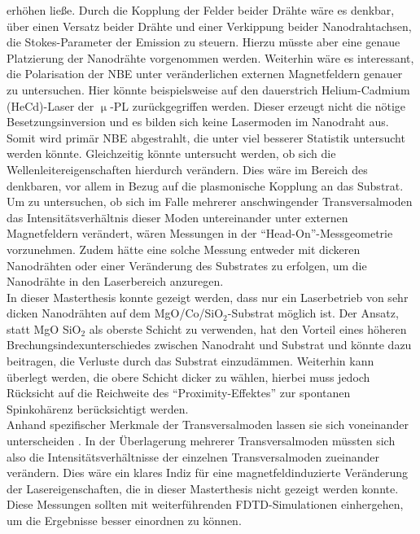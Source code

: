 erhöhen ließe. Durch die Kopplung der Felder beider Drähte wäre es denkbar, über
einen Versatz beider Drähte und einer Verkippung beider Nanodrahtachsen, die
Stokes-Parameter der Emission zu steuern. Hierzu müsste aber eine genaue
Platzierung der Nanodrähte vorgenommen werden. Weiterhin wäre es interessant,
die Polarisation der NBE unter veränderlichen externen Magnetfeldern genauer zu
untersuchen. Hier könnte beispielsweise auf den dauerstrich Helium-Cadmium
(HeCd)-Laser  der $\upmu$-PL zurückgegriffen werden. Dieser erzeugt nicht die
nötige Besetzungsinversion und es bilden sich keine Lasermoden im Nanodraht aus.
Somit wird primär NBE abgestrahlt, die unter viel besserer Statistik untersucht
werden könnte. Gleichzeitig könnte untersucht werden, ob sich die
Wellenleitereigenschaften hierdurch verändern. Dies wäre im Bereich des
denkbaren, vor allem in Bezug auf die plasmonische Kopplung an das Substrat.\\
Um zu untersuchen, ob sich im Falle mehrerer anschwingender Transversalmoden das
Intensitätsverhältnis dieser Moden untereinander unter externen Magnetfeldern
verändert, wären Messungen in der ``Head-On''-Messgeometrie vorzunehmen. Zudem
hätte eine solche Messung entweder mit dickeren Nanodrähten oder einer
Veränderung des Substrates zu erfolgen, um die Nanodrähte in den Laserbereich
anzuregen.\\ In dieser Masterthesis konnte gezeigt werden, dass nur ein
Laserbetrieb von sehr dicken Nanodrähten auf dem MgO/Co/SiO$_\text{2}$-Substrat
möglich ist. Der Ansatz, statt MgO SiO$_\text{2}$ als oberste Schicht zu
verwenden, hat den Vorteil eines höheren Brechungsindexunterschiedes zwischen
Nanodraht und Substrat und könnte dazu beitragen, die Verluste durch das
Substrat einzudämmen. Weiterhin kann überlegt werden, die obere Schicht dicker
zu wählen, hierbei muss jedoch Rücksicht auf die Reichweite des
``Proximity-Effektes'' zur spontanen Spinkohärenz berücksichtigt werden.\\
Anhand spezifischer Merkmale der Transversalmoden lassen sie sich voneinander
unterscheiden \cite{Roeder.Diss}. In der Überlagerung mehrerer Transversalmoden
müssten sich also die Intensitätsverhältnisse der einzelnen Transversalmoden
zueinander verändern. Dies wäre ein klares Indiz für eine magnetfeldinduzierte
Veränderung der Lasereigenschaften, die in dieser Masterthesis nicht gezeigt
werden konnte. Diese Messungen sollten mit weiterführenden FDTD-Simulationen
einhergehen, um die Ergebnisse besser einordnen zu können.
